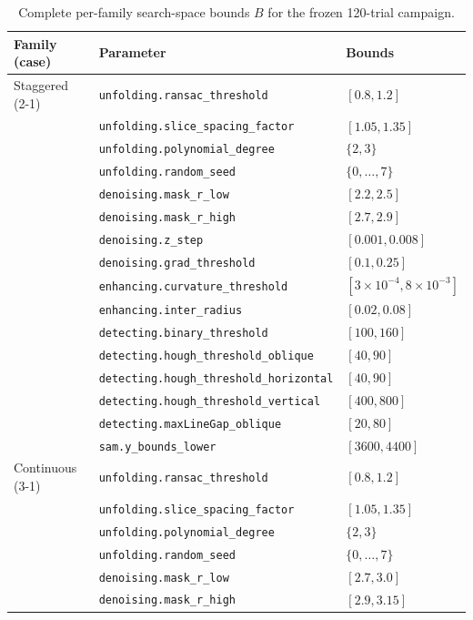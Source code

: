 \documentclass[a4paper,fleqn]{cas-dc}
\begin{document}
\begin{table}[t]
\caption{Complete per-family search-space bounds $B$ for the frozen 120-trial campaign.}\label{tab:bo-bounds}
{\small
\begin{tabular*}{\textwidth}{@{\extracolsep{\fill}} llp{} @{}}
\toprule
Family (case) & Parameter & Bounds \\
\midrule
Staggered (2-1) & \texttt{unfolding.ransac\_threshold} & $[0.8,1.2]$ \\
 & \texttt{unfolding.slice\_spacing\_factor} & $[1.05,1.35]$ \\
 & \texttt{unfolding.polynomial\_degree} & $\{2,3\}$ \\
 & \texttt{unfolding.random\_seed} & $\{0,\ldots,7\}$ \\
 & \texttt{denoising.mask\_r\_low} & $[2.2,2.5]$ \\
 & \texttt{denoising.mask\_r\_high} & $[2.7,2.9]$ \\
 & \texttt{denoising.z\_step} & $[0.001,0.008]$ \\
 & \texttt{denoising.grad\_threshold} & $[0.1,0.25]$ \\
 & \texttt{enhancing.curvature\_threshold} & $[3{\times}10^{-4},8{\times}10^{-3}]$ \\
 & \texttt{enhancing.inter\_radius} & $[0.02,0.08]$ \\
 & \texttt{detecting.binary\_threshold} & $[100,160]$ \\
 & \texttt{detecting.hough\_threshold\_oblique} & $[40,90]$ \\
 & \texttt{detecting.hough\_threshold\_horizontal} & $[40,90]$ \\
 & \texttt{detecting.hough\_threshold\_vertical} & $[400,800]$ \\
 & \texttt{detecting.maxLineGap\_oblique} & $[20,80]$ \\
 & \texttt{sam.y\_bounds\_lower} & $[3600,4400]$ \\
\addlinespace
Continuous (3-1) & \texttt{unfolding.ransac\_threshold} & $[0.8,1.2]$ \\
 & \texttt{unfolding.slice\_spacing\_factor} & $[1.05,1.35]$ \\
 & \texttt{unfolding.polynomial\_degree} & $\{2,3\}$ \\
 & \texttt{unfolding.random\_seed} & $\{0,\ldots,7\}$ \\
 & \texttt{denoising.mask\_r\_low} & $[2.7,3.0]$ \\
 & \texttt{denoising.mask\_r\_high} & $[2.9,3.15]$ \\

\end{tabular*}}
\end{table}
\end{document}
